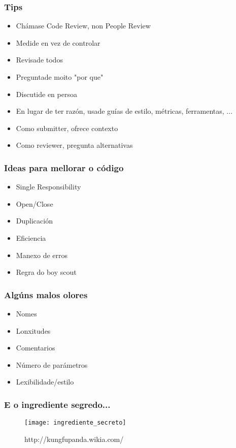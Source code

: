 \begin{frame}
  \frametitle{Tips}
  \begin{itemize}
    \item Chámase Code Review, non People Review
    \item Medide en vez de controlar
    \item Revisade todos
    \item Preguntade moito "por que"
    \item Discutide en persoa
    \item En lugar de ter razón, usade guías de estilo, métricas, ferramentas, ...
    \item Como submitter, ofrece contexto
    \item Como reviewer, pregunta alternativas
  \end{itemize}
\end{frame}

\begin{frame}
  \frametitle{Ideas para mellorar o código}
  \begin{itemize}
    \item Single Responsibility
    \item Open/Close
    \item Duplicación
    \item Eficiencia
    \item Manexo de erros
    \item Regra do boy scout
  \end{itemize}
\end{frame}

\begin{frame}
  \frametitle{Algúns malos olores}
  \begin{itemize}
    \item Nomes
    \item Lonxitudes
    \item Comentarios
    \item Número de parámetros
    \item Lexibilidade/estilo
  \end{itemize}
\end{frame}

\begin{frame}
  \frametitle{E o ingrediente segredo...}
  \begin{figure}[ht]
    \centering
    \texttt{[image: ingrediente\_secreto]}
    \caption{http://kungfupanda.wikia.com/}
  \end{figure}
\end{frame}
